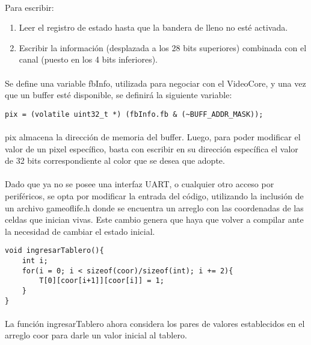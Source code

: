 \documentclass{article}
\begin{document}
\paragraph{}
Para escribir:

\begin{enumerate}
\item Leer el registro de estado hasta que la bandera de lleno no est\'e activada.
\item Escribir la informaci\'on (desplazada a los 28 bits superiores) combinada con el canal (puesto en los 4 bits inferiores).
\end{enumerate}

\paragraph{}
Se define una variable fbInfo, utilizada para negociar con el VideoCore, y una vez que un buffer est\'e disponible, se definir\'a la siguiente variable:

\begin{lstlisting}
pix = (volatile uint32_t *) (fbInfo.fb & (~BUFF_ADDR_MASK));
\end{lstlisting}

\paragraph{}
pix almacena la direcci\'on de memoria del buffer. Luego, para poder modificar el valor de un pixel espec\'ifico, basta con escribir en su direcci\'on espec\'ifica el valor de 32 bits correspondiente al color que se desea que adopte.

\paragraph{}
Dado que ya no se posee una interfaz UART, o cualquier otro acceso por perif\'ericos, se opta por modificar la entrada del c\'odigo, utilizando la inclusi\'on de un archivo gameoflife.h donde se encuentra un arreglo con las coordenadas de las celdas que inician vivas. Este cambio genera que haya que volver a compilar ante la necesidad de cambiar el estado inicial.

\begin{lstlisting}
void ingresarTablero(){
	int i;
	for(i = 0; i < sizeof(coor)/sizeof(int); i += 2){
		T[0][coor[i+1]][coor[i]] = 1;
	}
}
\end{lstlisting}

\paragraph{}
La funci\'on ingresarTablero ahora considera los pares de valores establecidos en el arreglo coor para darle un valor inicial al tablero.
\end{document}
